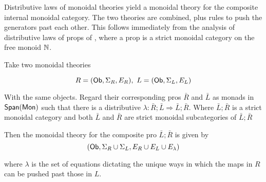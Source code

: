 Distributive laws of monoidal theories yield a monoidal theory for the composite internal monoidal category. The two theories are combined,  plus rules to push the generators past each other.  This follows immediately from the analysis of distributive laws of props of \cite[Theorem 3.8]{lack}, where a prop is a strict monoidal category on the free monoid $\mathbb{N}$.  

\begin{lemma}
Take two monoidal theories

$$
R=({\sf Ob},\Sigma_R ,E_R ), \ L=({\sf Ob},\Sigma_L ,E_L )
$$

With the same objects.  Regard their corresponding pros $\bar{R}$ and $\bar{L}$ as monads in $\mathsf{Span}({\sf Mon})$ such that there is a distributive $\lambda:\bar{R};\bar{L} \Rightarrow \bar{L};\bar{R}$.  Where $ \bar{L};\bar{R}$ is a strict monoidal category and both $\bar L$ and $\bar R$ are strict monoidal subcategories of   $\bar{L};\bar{R}$


Then the monoidal theory for the composite pro $\bar{L};\bar{R}$ is given by 
$$
({\sf Ob}, \Sigma_R\cup \Sigma_L, E_R\cup E_L \cup E_\lambda)
$$

where $\lambda$ is the set of equations dictating the unique ways in which the maps in $R$ can be pushed past those in $L$.
\end{lemma}





